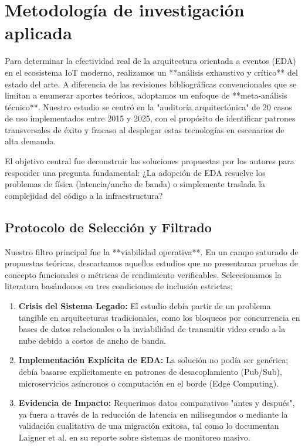 \section{Metodología de investigación aplicada}

Para determinar la efectividad real de la arquitectura orientada a eventos (EDA) en el ecosistema IoT moderno, realizamos un **análisis exhaustivo y crítico** del estado del arte. A diferencia de las revisiones bibliográficas convencionales que se limitan a enumerar aportes teóricos, adoptamos un enfoque de **meta-análisis técnico**. Nuestro estudio se centró en la "auditoría arquitectónica" de 20 casos de uso implementados entre 2015 y 2025, con el propósito de identificar patrones transversales de éxito y fracaso al desplegar estas tecnologías en escenarios de alta demanda.

El objetivo central fue deconstruir las soluciones propuestas por los autores para responder una pregunta fundamental: ¿La adopción de EDA resuelve los problemas de física (latencia/ancho de banda) o simplemente traslada la complejidad del código a la infraestructura?

\subsection{Protocolo de Selección y Filtrado}
Nuestro filtro principal fue la **viabilidad operativa**. En un campo saturado de propuestas teóricas, descartamos aquellos estudios que no presentaran pruebas de concepto funcionales o métricas de rendimiento verificables. Seleccionamos la literatura basándonos en tres condiciones de inclusión estrictas:

\begin{enumerate}
    \item \textbf{Crisis del Sistema Legado:} El estudio debía partir de un problema tangible en arquitecturas tradicionales, como los bloqueos por concurrencia en bases de datos relacionales o la inviabilidad de transmitir video crudo a la nube debido a costos de ancho de banda.
    \item \textbf{Implementación Explícita de EDA:} La solución no podía ser genérica; debía basarse explícitamente en patrones de desacoplamiento (Pub/Sub), microservicios asíncronos o computación en el borde (Edge Computing).
    \item \textbf{Evidencia de Impacto:} Requerimos datos comparativos "antes y después", ya fuera a través de la reducción de latencia en milisegundos o mediante la validación cualitativa de una migración exitosa, tal como lo documentan Laigner et al. \cite{laigner2020monolithic} en su reporte sobre sistemas de monitoreo masivo.
\end{enumerate}


